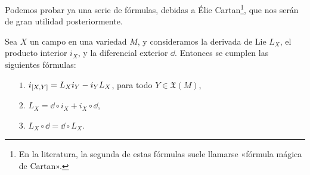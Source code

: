 Podemos probar ya una serie de fórmulas, debidas a Élie Cartan\footnote{En la literatura, la segunda de estas fórmulas suele llamarse «fórmula mágica de Cartan».}, que nos serán de gran utilidad posteriormente.
\begin{thm}
  Sea $X$ un campo en una variedad $M$, y consideramos la derivada de Lie $L_X$, el producto interior $i_X$, y la diferencial exterior $\dd$. Entonces se cumplen las siguientes fórmulas:
  \begin{enumerate}
    \item[$1$.] $i_{\left[X,Y\right]}=L_X i_Y - i_Y L_X$, para todo $Y \in \mathfrak{X}(M)$,
    \item[$2$.] $L_X= \dd \circ i_X + i_X \circ \dd $,
    \item[$3$.] $L_X\circ \dd = \dd \circ L_X$.
  \end{enumerate}
\end{thm}
